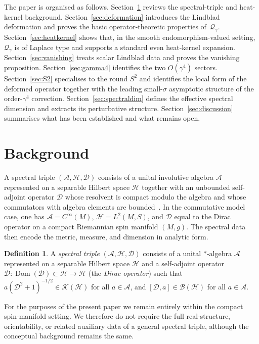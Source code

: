 \documentclass[11pt,a4paper]{article}
\numberwithin{equation}{section}
\theoremstyle{definition}
\newtheorem{Definition}[Theorem]{Definition}
\newcommand{\cA}{\mathcal{A}}
\newcommand{\cH}{\mathcal{H}}
\newcommand{\cD}{\mathcal{D}}
\newcommand{\Qg}{\mathcal{Q}_\gamma}
\newcommand{\Dom}{\operatorname{Dom}}
\begin{document}
The paper is organised as follows. Section~\ref{sec:background} reviews
the spectral-triple and heat-kernel background. Section~\ref{sec:deformation}
introduces the Lindblad deformation and proves the basic
operator-theoretic properties of~$\Qg$. Section~\ref{sec:heatkernel}
shows that, in the smooth endomorphism-valued setting, $\Qg$ is of
Laplace type and supports a standard even heat-kernel expansion. Section~\ref{sec:vanishing} treats scalar Lindblad
data and proves the vanishing proposition. Section~\ref{sec:gamma4}
identifies the two $O(\gamma^4)$ sectors. Section~\ref{sec:S2}
specialises to the round $S^2$ and identifies the local form of the
deformed operator together with the leading small-$\sigma$ asymptotic
structure of the order-$\gamma^4$ correction. Section~\ref{sec:spectraldim}
defines the effective spectral dimension and extracts its perturbative
structure. Section~\ref{sec:discussion} summarises what has been
established and what remains open.

\section{Background}
\label{sec:background}

A spectral triple $(\cA,\cH,\cD)$ consists of a unital involutive
algebra $\cA$ represented on a separable Hilbert space $\cH$ together
with an unbounded self-adjoint operator $\cD$ whose resolvent is compact
modulo the algebra and whose commutators with algebra elements are
bounded~\cite{Connes1994,Connes1995,ConnesMarcolli2008}. In the
commutative model case, one has $\cA=C^\infty(M)$, $\cH=L^2(M,S)$, and
$\cD$ equal to the Dirac operator on a compact Riemannian spin manifold
$(M,g)$. The spectral data then encode the metric, measure, and dimension
in analytic form.

\begin{Definition}
A \emph{spectral triple} $(\cA,\cH,\cD)$ consists of a unital
$*$-algebra $\cA$ represented on a separable Hilbert space $\cH$ and a
self-adjoint operator $\cD \colon \Dom(\cD) \subset \cH \to \cH$
(the \emph{Dirac operator}) such that $a(\cD^2+1)^{-1/2} \in
\mathcal{K}(\cH)$ for all $a \in \cA$, and $[\cD, a] \in
\mathcal{B}(\cH)$ for all $a \in \cA$.
\end{Definition}

For the purposes of the present paper we remain entirely within the
compact spin-manifold setting. We therefore do not require the full
real-structure, orientability, or related auxiliary data of a general
spectral triple, although the conceptual background remains the same.
\end{document}
